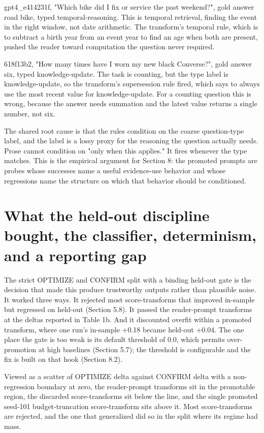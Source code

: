 gpt4\_e414231f, "Which bike did I fix or service the past weekend?", gold answer road bike, typed temporal-reasoning. This is temporal retrieval, finding the event in the right window, not date arithmetic. The transform's temporal rule, which is to subtract a birth year from an event year to find an age when both are present, pushed the reader toward computation the question never required.

618f13b2, "How many times have I worn my new black Converse?", gold answer six, typed knowledge-update. The task is counting, but the type label is knowledge-update, so the transform's supersession rule fired, which says to always use the most recent value for knowledge-update. For a counting question this is wrong, because the answer needs summation and the latest value returns a single number, not six.

The shared root cause is that the rules condition on the coarse question-type label, and the label is a lossy proxy for the reasoning the question actually needs. Prose cannot condition on "only when this applies." It fires whenever the type matches. This is the empirical argument for Section 8: the promoted prompts are probes whose successes name a useful evidence-use behavior and whose regressions name the structure on which that behavior should be conditioned.


\section{What the held-out discipline bought, the classifier, determinism, and a reporting gap}

The strict OPTIMIZE and CONFIRM split with a binding held-out gate is the decision that made this produce trustworthy outputs rather than plausible noise. It worked three ways. It rejected most score-transforms that improved in-sample but regressed on held-out (Section 5.8). It passed the reader-prompt transforms at the deltas reported in Table 1b. And it discounted overfit within a promoted transform, where one run's in-sample +0.18 became held-out +0.04. The one place the gate is too weak is its default threshold of 0.0, which permits over-promotion at high baselines (Section 5.7); the threshold is configurable and the fix is built on that hook (Section 8.2).

Viewed as a scatter of OPTIMIZE delta against CONFIRM delta with a non-regression boundary at zero, the reader-prompt transforms sit in the promotable region, the discarded score-transforms sit below the line, and the single promoted seed-101 budget-truncation score-transform sits above it. Most score-transforms are rejected, and the one that generalized did so in the split where its regime had mass.

